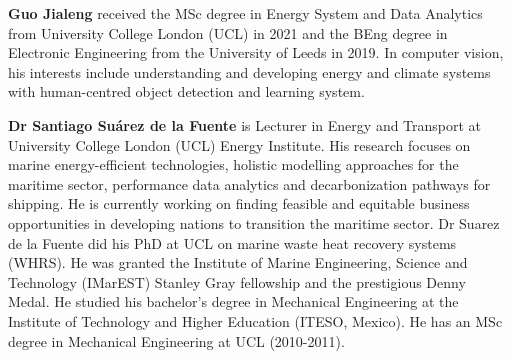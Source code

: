 \documentclass[lettersize,journal]{IEEEtran}
\begin{document}
\vspace{11pt}
\textbf{Guo Jialeng} received the MSc degree in Energy System and Data Analytics from University College London (UCL) in 2021 and the BEng degree in Electronic Engineering from the University of Leeds in 2019. In computer vision, his interests include understanding and developing energy and climate systems with human-centred object detection and learning system.

\textbf{Dr Santiago Suárez de la Fuente} is Lecturer in Energy and Transport at University College London (UCL) Energy Institute. His research focuses on marine energy-efficient technologies, holistic modelling approaches for the maritime sector, performance data analytics and decarbonization pathways for shipping. He is currently working on finding feasible and equitable business opportunities in developing nations to transition the maritime sector. Dr Suarez de la Fuente did his PhD at UCL on marine waste heat recovery systems (WHRS). He was granted the Institute of Marine Engineering, Science and Technology (IMarEST) Stanley Gray fellowship and the prestigious Denny Medal. He studied his bachelor’s degree in Mechanical Engineering at the Institute of Technology and Higher Education (ITESO, Mexico). He has an MSc degree in Mechanical Engineering at UCL (2010-2011).







\vfill
\end{document}
